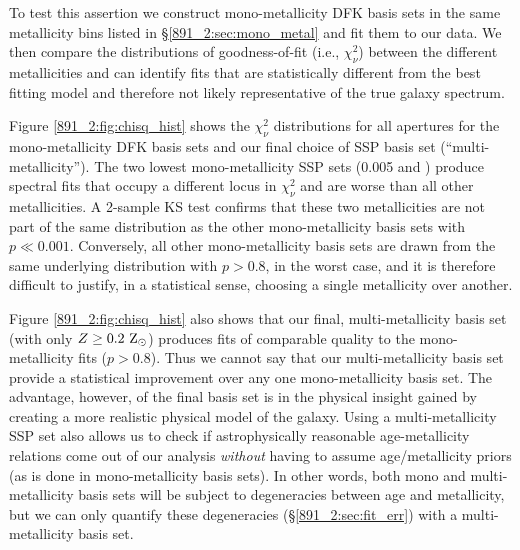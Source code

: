 To test this assertion we construct mono-metallicity DFK basis sets in
the same metallicity bins listed in \S\ref{891_2:sec:mono_metal} and fit
them to our data. We then compare the distributions of goodness-of-fit
(i.e., $\chi^2_\nu$) between the different metallicities and can
identify fits that are statistically different from the best fitting
model and therefore not likely representative of the true galaxy
spectrum.

Figure \ref{891_2:fig:chisq_hist} shows the $\chi^2_\nu$ distributions for
all \GP apertures for the mono-metallicity DFK basis sets and our
final choice of SSP basis set (``multi-metallicity''). The two lowest
mono-metallicity SSP sets (0.005 and ) produce
spectral fits that occupy a different locus in $\chi^2_\nu$ and are
worse than all other metallicities. A 2-sample KS test confirms that
these two metallicities are not part of the same distribution as the
other mono-metallicity basis sets with $p \ll 0.001$. Conversely, all
other mono-metallicity basis sets are drawn from the same underlying
distribution with $p > 0.8$, in the worst case, and it is therefore
difficult to justify, in a statistical sense, choosing a single
metallicity over another. 

Figure \ref{891_2:fig:chisq_hist} also shows that our final,
multi-metallicity basis set (with only $Z \geq 0.2~\mathrm{\mathrm{Z}_{\odot}} $)
produces fits of comparable quality to the mono-metallicity fits ($p >
0.8$). Thus we cannot say that our multi-metallicity basis set provide
a statistical improvement over any one mono-metallicity basis set. The
advantage, however, of the final basis set is in the physical insight
gained by creating a more realistic physical model of the
galaxy. Using a multi-metallicity SSP set also allows us to check if
astrophysically reasonable age-metallicity relations come out of our
analysis \emph{without} having to assume age/metallicity priors (as is
done in mono-metallicity basis sets). In other words, both mono and
multi-metallicity basis sets will be subject to degeneracies between
age and metallicity, but we can only quantify these degeneracies
(\S\ref{891_2:sec:fit_err}) with a multi-metallicity basis set.


